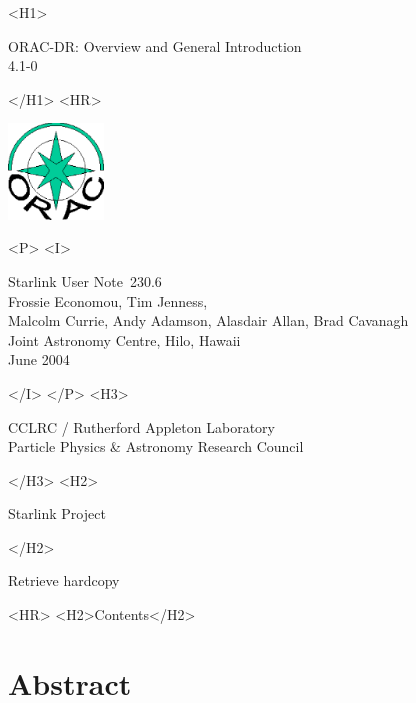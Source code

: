 \documentclass[twoside,11pt]{article}
\newcommand{\stardoccategory}  {Starlink User Note}
\newcommand{\stardocsource}    {sun\stardocnumber}
\newcommand{\stardocnumber}    {230.6}
\newcommand{\stardocauthors}   {Frossie Economou, Tim Jenness,\\ 
Malcolm Currie, Andy Adamson, Alasdair Allan, Brad Cavanagh\\
Joint Astronomy Centre, Hilo, Hawaii}
\newcommand{\stardocdate}      {June 2004}
\newcommand{\stardoctitle}     {ORAC-DR: Overview and General Introduction}
\newcommand{\stardocversion}   {4.1-0}
\newcommand{\stardocmanual}    {}
\newcommand{\htmladdnormallink}[2]{#1}
\newcommand{\htmladdimg}[1]{}
\newcommand{\htmlref}[2]{#1}
\newcommand{\htmladdtonavigation}[1]{}
\newcommand{\xlabel}[1]{}
\renewcommand{\_}{\texttt{\symbol{95}}}
\begin{document}
\begin{htmlonly}
   \xlabel{}
   \begin{rawhtml} <H1> \end{rawhtml}
      \stardoctitle\\
      \stardocversion\\
      \stardocmanual
   \begin{rawhtml} </H1> <HR> \end{rawhtml}

\includegraphics[width=1.0in]{sun230_logo.eps}

   \begin{rawhtml} <P> <I> \end{rawhtml}
   \stardoccategory\ \stardocnumber \\
   \stardocauthors \\
   \stardocdate
   \begin{rawhtml} </I> </P> <H3> \end{rawhtml}
      \htmladdnormallink{CCLRC / Rutherford Appleton Laboratory}
                        {http://www.cclrc.ac.uk} \\
      \htmladdnormallink{Particle Physics \& Astronomy Research Council}
                        {http://www.pparc.ac.uk} \\
   \begin{rawhtml} </H3> <H2> \end{rawhtml}
      \htmladdnormallink{Starlink Project}{http://www.starlink.rl.ac.uk/}
   \begin{rawhtml} </H2> \end{rawhtml}
   \htmladdnormallink{\htmladdimg{source.gif} Retrieve hardcopy}
      {http://www.starlink.rl.ac.uk/cgi-bin/hcserver?\stardocsource}\\

  \label{stardoccontents}
  \begin{rawhtml} 
    <HR>
    <H2>Contents</H2>
  \end{rawhtml}
  \htmladdtonavigation{\htmlref{\htmladdimg{contents_motif.gif}}
        {stardoccontents}}

  \section{\xlabel{abstract}Abstract}
\end{htmlonly}
\end{document}
